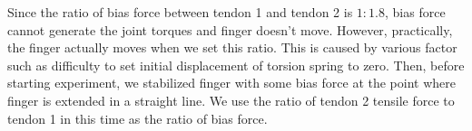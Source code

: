\documentclass{llncs}
\begin{document}
Since the ratio of bias force between tendon 1 and tendon 2 is $1:1.8$, 
bias force cannot generate the joint torques and 
finger doesn't move.
However, practically, the finger actually moves when we set this ratio.
This is caused by various factor such as difficulty to set initial displacement of torsion spring to zero.
Then, before starting experiment, we stabilized finger with some bias force at the point where finger is extended in a straight line.
We use the ratio of tendon 2 tensile force to tendon 1 in this time as the ratio of bias force. 


\end{document}

